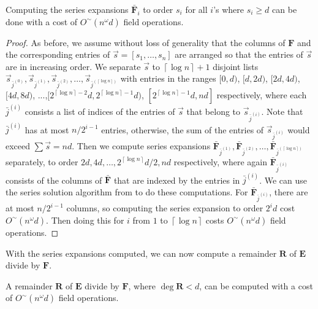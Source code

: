\begin{lem}
Computing the series expansions $\bar{\mathbf{F}}_{i}$ to order $s_{i}$
for all $i$'s where $s_{i}\ge d$ can be done with a cost of \textup{$O^{\sim}\left(n^{\omega}d\right)$
field operations.}\end{lem}
\begin{proof}
As before, we assume without loss of generality that the columns of
$\mathbf{F}$ and the corresponding entries of $\vec{s}=\left[s_{1},\dots,s_{n}\right]$
are arranged so that the entries of $\vec{s}$ are in increasing order.
We separate $\vec{s}$ to $\left\lceil \log n\right\rceil +1$ disjoint
lists  $\vec{s}_{\bar{j}^{\left(0\right)}},\vec{s}_{\bar{j}^{\left(1\right)}},\vec{s}_{\bar{j}^{\left(2\right)}},\dots,\vec{s}_{\bar{j}^{\left(\left\lceil \log n\right\rceil \right)}}$
with entries in the ranges $[0,d)$, $[d,2d)$, $[2d,4d)$, $[4d,8d)$,
...,$[2^{\left\lceil \log n\right\rceil -2}d,2^{\left\lceil \log n\right\rceil -1}d)$,
$[2^{\left\lceil \log n\right\rceil -1}d,nd]$ respectively, where
each $\bar{j}^{(i)}$ consists a list of indices of the entries of
$\vec{s}$ that belong to $\vec{s}_{\bar{j}^{\left(i\right)}}$. Note
that $\bar{j}^{\left(i\right)}$ has at most $n/2^{i-1}$ entries,
otherwise, the sum of the entries of $\vec{s}_{\bar{j}^{(i)}}$ would
exceed $\sum\vec{s}=nd$. Then we compute series expansions $\bar{\mathbf{F}}_{\bar{j}^{\left(1\right)}},\bar{\mathbf{F}}_{\bar{j}^{\left(2\right)}},\dots,\bar{\mathbf{F}}_{\bar{j}^{\left(\left\lceil \log n\right\rceil \right)}}$
separately, to order $2d,4d,\dots,2^{\left\lceil \log n\right\rceil }d/2,nd$
respectively, where again $\bar{\mathbf{F}}_{\bar{j}^{(i)}}$ consists
of the columns of $\bar{\mathbf{F}}$ that are indexed by the entries
in $\bar{j}^{\left(i\right)}$. We can use the series solution algorithm
from \citet{storjohann:2003} to do these computations. For $\bar{\mathbf{F}}{}_{\bar{j}^{\left(i\right)}}$,
there are at most $n/2^{i-1}$ columns, so computing the series expansion
to order $2^{i}d$ cost $O^{\sim}\left(n^{\omega}d\right)$. Then
doing this for $i$ from $1$ to $\left\lceil \log n\right\rceil $
costs $O^{\sim}\left(n^{\omega}d\right)$ field operations. 
\end{proof}
With the series expansions computed, we can now compute a remainder
$\mathbf{R}$ of $\mathbf{E}$ divide by $\mathbf{F}$.
\begin{lem}
A remainder $\mathbf{R}$ of $\mathbf{E}$ divide by $\mathbf{F}$,
where $\deg\mathbf{R}<d$, can be computed with a cost of $O^{\sim}\left(n^{\omega}d\right)$
field operations.\end{lem}

